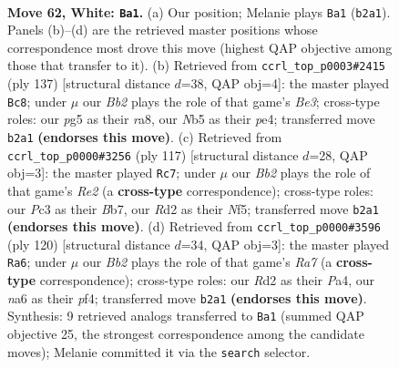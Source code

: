 \documentclass[11pt]{article}
\begin{document}
\clearpage

\begin{figure}[p]\centering
\begin{subfigure}{0.46\textwidth}\centering
\resizebox{\linewidth}{!}{%
\newchessgame
\chessboard[
  setfen={8/4p1k1/npr5/pN4p1/P1p5/2P3K1/1B1R4/8 w - - 4 62},
  showmover=false,
  pgfstyle=straightmove, color=movearrow, markmove={b2-a1}
]}
\caption{}
\end{subfigure}\hfill
\begin{subfigure}{0.46\textwidth}\centering
\resizebox{\linewidth}{!}{%
\newchessgame
\chessboard[
  setfen={R7/6k1/2r1bpp1/7p/4P2P/B4P2/6PK/8 b - - 63 69},
  showmover=false,
  pgfstyle=straightmove, color=movearrow, markmove={e6-c8}
]}
\caption{}
\end{subfigure}
\\[4pt]
\begin{subfigure}{0.46\textwidth}\centering
\resizebox{\linewidth}{!}{%
\newchessgame
\chessboard[
  setfen={3R4/1b2r3/p7/2P2nk1/RP4p1/2K4p/P4P1P/8 b - - 5 59},
  showmover=false,
  pgfstyle=straightmove, color=movearrow, markmove={e7-c7}
]}
\caption{}
\end{subfigure}\hfill
\begin{subfigure}{0.46\textwidth}\centering
\resizebox{\linewidth}{!}{%
\newchessgame
\chessboard[
  setfen={6k1/R7/1p3r1p/4Nbp1/P2P1p2/5P1P/4K3/8 w - - 5 61},
  showmover=false,
  pgfstyle=straightmove, color=movearrow, markmove={a7-a6}
]}
\caption{}
\end{subfigure}
\caption{\textbf{Move 62, White: \texttt{Ba1}.} (a) Our position; Melanie plays \texttt{Ba1} (\texttt{b2a1}). Panels (b)--(d) are the retrieved master positions whose correspondence most drove this move (highest QAP objective among those that transfer to it). (b) Retrieved from \texttt{ccrl\_top\_p0003\#2415} (ply 137) [structural distance $d$=38, QAP obj=4]: the master played \texttt{Bc8}; under $\mu$ our \emph{Bb2} plays the role of that game's \emph{Be3}; cross-type roles: our \emph{p}g5 as their \emph{r}a8, our \emph{N}b5 as their \emph{p}e4; transferred move \texttt{b2a1} \textbf{(endorses this move)}. (c) Retrieved from \texttt{ccrl\_top\_p0000\#3256} (ply 117) [structural distance $d$=28, QAP obj=3]: the master played \texttt{Rc7}; under $\mu$ our \emph{Bb2} plays the role of that game's \emph{Re2} (a \textbf{cross-type} correspondence); cross-type roles: our \emph{P}c3 as their \emph{B}b7, our \emph{R}d2 as their \emph{N}f5; transferred move \texttt{b2a1} \textbf{(endorses this move)}. (d) Retrieved from \texttt{ccrl\_top\_p0000\#3596} (ply 120) [structural distance $d$=34, QAP obj=3]: the master played \texttt{Ra6}; under $\mu$ our \emph{Bb2} plays the role of that game's \emph{Ra7} (a \textbf{cross-type} correspondence); cross-type roles: our \emph{R}d2 as their \emph{P}a4, our \emph{n}a6 as their \emph{p}f4; transferred move \texttt{b2a1} \textbf{(endorses this move)}. Synthesis: 9 retrieved analogs transferred to \texttt{Ba1} (summed QAP objective 25, the strongest correspondence among the candidate moves); Melanie committed it via the \texttt{search} selector.}
\label{fig:thought-m122}
\end{figure}
\end{document}
